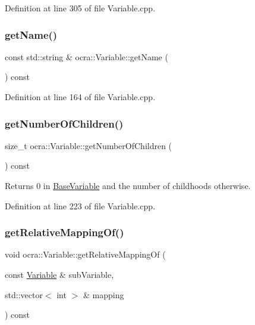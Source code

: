 Definition at line 305 of file Variable.\+cpp.

\hypertarget{classocra_1_1Variable_aa12682566f80ebf4b1d6208b09cda92f}{}\label{classocra_1_1Variable_aa12682566f80ebf4b1d6208b09cda92f} 
\subsubsection{\texorpdfstring{get\+Name()}{getName()}}
{\footnotesize\ttfamily const std\+::string \& ocra\+::\+Variable\+::get\+Name (\begin{DoxyParamCaption}{ }\end{DoxyParamCaption}) const\hspace{0.3cm}{\ttfamily [virtual]}}



Definition at line 164 of file Variable.\+cpp.

\hypertarget{classocra_1_1Variable_aabb9b5602a269bb9a2baf18184b29292}{}\label{classocra_1_1Variable_aabb9b5602a269bb9a2baf18184b29292} 
\subsubsection{\texorpdfstring{get\+Number\+Of\+Children()}{getNumberOfChildren()}}
{\footnotesize\ttfamily size\+\_\+t ocra\+::\+Variable\+::get\+Number\+Of\+Children (\begin{DoxyParamCaption}{ }\end{DoxyParamCaption}) const}



Returns 0 in \hyperlink{classocra_1_1BaseVariable}{Base\+Variable} and the number of childhoods otherwise. 



Definition at line 223 of file Variable.\+cpp.

\hypertarget{classocra_1_1Variable_adf9c5d4fbc20d6f6813de758f3193008}{}\label{classocra_1_1Variable_adf9c5d4fbc20d6f6813de758f3193008} 
\subsubsection{\texorpdfstring{get\+Relative\+Mapping\+Of()}{getRelativeMappingOf()}}
{\footnotesize\ttfamily void ocra\+::\+Variable\+::get\+Relative\+Mapping\+Of (\begin{DoxyParamCaption}\item[{const \hyperlink{classocra_1_1Variable}{Variable} \&}]{sub\+Variable,  }\item[{std\+::vector$<$ int $>$ \&}]{mapping }\end{DoxyParamCaption}) const}



